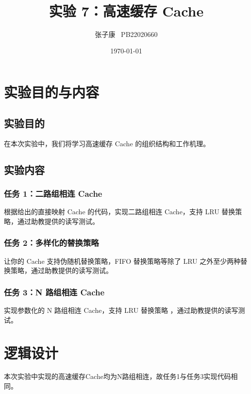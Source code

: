 \documentclass[12pt,a4paper]{ctexart}
\title{实验 7：高速缓存 Cache}
\author{张子康 \ PB22020660}
\date{\today}
\begin{document}
\maketitle
\newpage
\section{实验目的与内容}
\subsection{实验目的}
在本次实验中，我们将学习高速缓存 Cache 的组织结构和工作机理。
\subsection{实验内容}
\subsubsection{任务 1：二路组相连 Cache}
根据给出的直接映射 Cache 的代码，实现二路组相连 Cache，支持 LRU 替换策略，通过助教提供的读写测试。
\subsubsection{任务 2：多样化的替换策略}
让你的 Cache 支持伪随机替换策略，FIFO 替换策略等除了 LRU 之外至少两种替换策略，通过助教提供的读写测试。
\subsubsection{任务 3：N 路组相连 Cache}
实现参数化的 N 路组相连 Cache，支持 LRU 替换策略
，通过助教提供的读写测试。
\section{逻辑设计}
本次实验中实现的高速缓存Cache均为N路组相连，故任务1与任务3实现代码相同。
\end{document}
